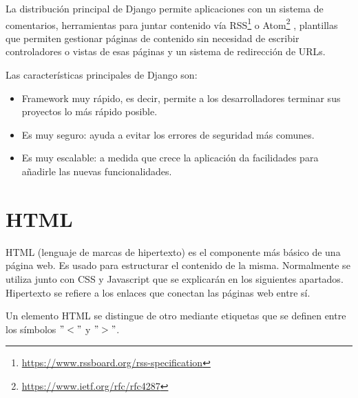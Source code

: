 \documentclass[a4paper, 12pt]{book}
\begin{document}
La distribución principal de Django permite aplicaciones con un sistema de comentarios, herramientas para juntar contenido vía RSS\footnote{\url{https://www.rssboard.org/rss-specification}} o Atom\footnote{\url{https://www.ietf.org/rfc/rfc4287}} , plantillas que permiten gestionar páginas de contenido sin necesidad de escribir controladores o vistas de esas páginas  y un sistema de redirección de URLs.

Las características principales de Django son:

\begin{itemize}
	\item Framework muy rápido, es decir, permite a los desarrolladores terminar sus proyectos lo más rápido posible.
	\item Es muy seguro: ayuda a evitar los errores de seguridad más comunes.
	\item Es muy escalable: a medida que crece la aplicación da facilidades para añadirle las nuevas funcionalidades.
\end{itemize} 

\section{HTML}
\label{sec:html}

HTML\cite{website:HTML}  (lenguaje de marcas de hipertexto) es el componente más básico de una página web. Es usado para estructurar el contenido de la misma. Normalmente se utiliza junto con CSS y Javascript que se explicarán en los siguientes apartados.
Hipertexto se refiere a los enlaces que conectan las páginas web entre sí.

Un elemento HTML se distingue de otro mediante etiquetas que se definen entre los símbolos $"<"$ y $">"$. 
\end{document}
